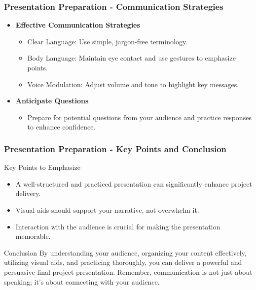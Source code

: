 \documentclass{beamer}
\begin{document}
\begin{frame}[fragile]
    \frametitle{Presentation Preparation - Communication Strategies}
    \begin{itemize}
        \item \textbf{Effective Communication Strategies}
            \begin{itemize}
                \item Clear Language: Use simple, jargon-free terminology.
                \item Body Language: Maintain eye contact and use gestures to emphasize points.
                \item Voice Modulation: Adjust volume and tone to highlight key messages.
            \end{itemize}
        
        \item \textbf{Anticipate Questions}
            \begin{itemize}
                \item Prepare for potential questions from your audience and practice responses to enhance confidence.
            \end{itemize}
    \end{itemize}
\end{frame}

\begin{frame}[fragile]
    \frametitle{Presentation Preparation - Key Points and Conclusion}
    \begin{block}{Key Points to Emphasize}
        \begin{itemize}
            \item A well-structured and practiced presentation can significantly enhance project delivery.
            \item Visual aids should support your narrative, not overwhelm it.
            \item Interaction with the audience is crucial for making the presentation memorable.
        \end{itemize}
    \end{block}

    \begin{block}{Conclusion}
        By understanding your audience, organizing your content effectively, utilizing visual aids, and practicing thoroughly, you can deliver a powerful and persuasive final project presentation. 
        Remember, communication is not just about speaking; it’s about connecting with your audience.
    \end{block}
\end{frame}
\end{document}
